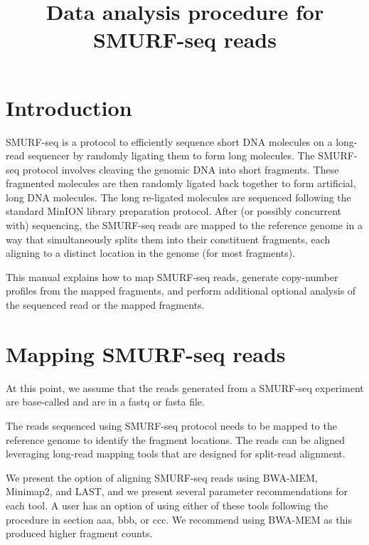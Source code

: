 \documentclass[11pt]{article}
\title{Data analysis procedure for SMURF-seq reads}
\date{}
\begin{document}
\maketitle
\tableofcontents

\newpage
\section{Introduction}
SMURF-seq is a protocol to efficiently sequence short DNA molecules on 
a long-read sequencer by randomly ligating them to form 
long molecules.
%
The SMURF-seq protocol involves cleaving the genomic DNA into short
fragments. These fragmented molecules are then randomly ligated back
together to form artificial, long DNA molecules. The long re-ligated
molecules are sequenced following the standard MinION library
preparation protocol. After (or possibly concurrent with) sequencing,
the SMURF-seq reads are mapped to the reference genome in a way that
simultaneously splits them into their constituent fragments, each
aligning to a distinct location in the genome (for most fragments).

%
This manual explains how to map SMURF-seq reads, generate copy-number profiles
from the mapped fragments, and perform additional optional analysis of the
sequenced read or the mapped fragments.



\section{Mapping SMURF-seq reads}
At this point, we assume that the reads generated from a 
SMURF-seq experiment are base-called and are in a fastq or
fasta file.

The reads sequenced using SMURF-seq protocol needs to be mapped to the 
reference genome to identify the fragment locations. The reads can be
aligned leveraging long-read mapping tools that are designed for split-read
alignment. 

We present the option of aligning SMURF-seq reads using BWA-MEM, 
Minimap2, and LAST, and we present several parameter recommendations for
each tool. A user has an option of using either of these tools following
the procedure in section aaa, bbb, or ccc. We recommend using BWA-MEM as
this produced higher fragment counts.
\end{document}
